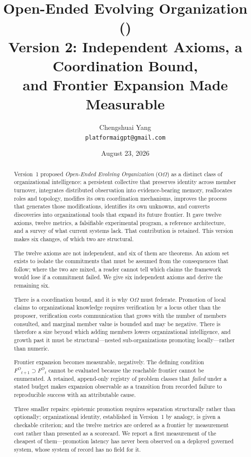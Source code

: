 \documentclass[11pt]{article}
\title{\LARGE Open-Ended Evolving Organization (\OOm{})\\[6pt]
\large Version 2: Independent Axioms, a Coordination Bound,\\
and Frontier Expansion Made Measurable}
\author{Chengshuai Yang\\
\small\texttt{platformaigpt@gmail.com}}
\date{August 23, 2026}
\newcommand{\OOm}{\ensuremath{\mathrm{O}\Omega}}
\newcommand{\Fo}{\ensuremath{F^O}}
\begin{document}
\maketitle

\begin{abstract}
Version~1 proposed \emph{Open-Ended Evolving Organization} (\OOm{}) as a distinct class of organizational intelligence: a persistent collective that preserves identity across member turnover, integrates distributed observation into evidence-bearing memory, reallocates roles and topology, modifies its own coordination mechanisms, improves the process that generates those modifications, identifies its own unknowns, and converts discoveries into organizational tools that expand its future frontier. It gave twelve axioms, twelve metrics, a falsifiable experimental program, a reference architecture, and a survey of what current systems lack. That contribution is retained. This version makes six changes, of which two are structural.

The twelve axioms are not independent, and six of them are theorems. An axiom set exists to isolate the commitments that must be assumed from the consequences that follow; where the two are mixed, a reader cannot tell which claims the framework would lose if a commitment failed. We give six independent axioms and derive the remaining six.

There is a coordination bound, and it is why \OOm{} must federate. Promotion of local claims to organizational knowledge requires verification by a locus other than the proposer, verification costs communication that grows with the number of members consulted, and marginal member value is bounded and may be negative. There is therefore a size beyond which adding members lowers organizational intelligence, and growth past it must be structural---nested sub-organizations promoting locally---rather than numeric.

Frontier expansion becomes measurable, negatively. The defining condition $\Fo_{t+1} \supset \Fo_t$ cannot be evaluated because the reachable frontier cannot be enumerated. A retained, append-only registry of problem classes that \emph{failed} under a stated budget makes expansion observable as a transition from recorded failure to reproducible success with an attributable cause.

Three smaller repairs: epistemic promotion requires separation structurally rather than optionally; organizational identity, established in Version~1 by analogy, is given a checkable criterion; and the twelve metrics are ordered as a frontier by measurement cost rather than presented as a scorecard. We report a first measurement of the cheapest of them---promotion latency has never been observed on a deployed governed system, whose system of record has no field for it.
\end{abstract}
\end{document}
